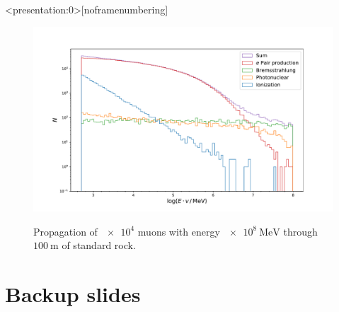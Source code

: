 \documentclass[aspectratio=1610, captions=tableheading, 11pt]{beamer}
\begin{document}
\begin{frame}<presentation:0>[noframenumbering]
\begin{figure}
  \begin{minipage}[c]{0.7\textwidth}
    \includegraphics[width=\textwidth , trim=1.9cm 0.5cm 1.9cm 2cm,clip=true]{plots/standard.pdf}
  \end{minipage}\hfill
  \begin{minipage}[c]{0.3\textwidth}
    Propagation of $\num{e4}$ muons with energy $\SI{e8}{\mega\electronvolt}$ through $\SI{100}{\metre}$ of standard rock.
     \label{fig:03-03}
  \end{minipage}
\end{figure}

\end{frame}


\appendix
\section{Backup slides} 

\end{document}
